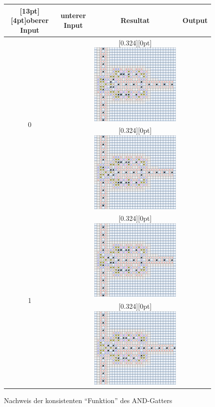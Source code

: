 \begin{figure}
\begin{center}
\begin{tabular}{|c|c|c|c|}
\hline
\raisebox{0pt}[13pt][4pt]{oberer Input}&unterer Input&Resultat&Output\\
\hline
\multirow{2}{10pt}{0}&%
\raisebox{11ex}{$0$}&%
\raisebox{0pt}[0.324\hsize][0pt]{%
\includegraphics[width=0.342\hsize]{graphics/and-00}}&%
\raisebox{11ex}{$0$}%
\\
\cline{2-4}
&\raisebox{11ex}{$1$}&%
\raisebox{0pt}[0.324\hsize][0pt]{%
\includegraphics[width=0.342\hsize]{graphics/and-01}}&%
\raisebox{11ex}{$0$}%
\\
\hline
\multirow{2}{10pt}{1}&%
\raisebox{11ex}{$0$}&%
\raisebox{0pt}[0.324\hsize][0pt]{%
\includegraphics[width=0.342\hsize]{graphics/and-10}}&%
\raisebox{11ex}{$0$}%
\\
\cline{2-4}
&\raisebox{11ex}{$1$}&%
\raisebox{0pt}[0.324\hsize][0pt]{%
\includegraphics[width=0.342\hsize]{graphics/and-11}}&%
\raisebox{11ex}{$1$}%
\\
\hline
\end{tabular}
\end{center}
\caption{Nachweis der konsistenten ``Funktion'' des AND-Gatters
\label{andstates}}
\end{figure}%

